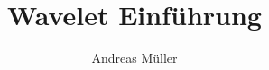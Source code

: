 %
%
%
\usepackage[utf8]{inputenc}
\usepackage[T1]{fontenc}
\usepackage{epic}
\usepackage{color}
\usepackage{array}
\usepackage{ifthen}
\usepackage{amsmath}
\usepackage{lmodern}
\usepackage{tikz}
\usetikzlibrary{shapes.geometric}
\beamertemplatenavigationsymbolsempty
\title[]{Wavelet Einführung}
\author{Andreas Müller}
\date[]{}

